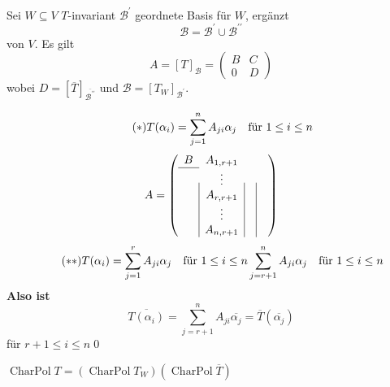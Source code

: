 \begin{subtheorem}
	Sei $ W \subseteq V $ $ T $-invariant $ \mathcal{B} ^\prime  $ geordnete Basis für $ W $, ergänzt
	\[
		\mathcal{B} = \mathcal{B} ^\prime \cup \mathcal{B} ^{\prime\prime} 
	\]
	von $ V $.
	Es gilt
	\[
		A = [T]_\mathcal{B} = \begin{pmatrix} B & C \\ 0 & D \end{pmatrix} 
	\]
	wobei $ D = \left[ \overline{T}  \right]_{\overline{\mathcal{B} ^{\prime\prime} } }  $ 
	und $ \mathcal{B} = \left[ T_W \right]_{\mathcal{B} ^\prime }  $.
\end{subtheorem}
\begin{subproof}
	\begin{equation}
		\label{3.22.2.1}
		\tag{$ * $}
		T(\alpha_i) = \sum_{j=1}^{n} A_{ji} \alpha_j \quad \text{für $ 1 \leq i \leq n $} 
	\end{equation}
	\[
		A =
		\left( 
			\begin{array}{c|c|c|c}
				B & A_{1, r + 1} & & \\\cline{1-1}
				  & \vdots & & \\
				  & A_{r, r + 1} & & \\
				  & \vdots & & \\
				  & A_{n, r + 1} & &
			\end{array}
		\right) 
	\]
	\begin{equation}
		\label{3.22.2.2}
		\tag{$ ** $}
		T(\alpha_i) = \sum_{j=1}^{r} A_{ji} \alpha_j \quad \text{für $ 1 \leq i \leq n $} \sum_{j=r + 1}^{n} A_{ji} \alpha_j \quad \text{für $ 1 \leq i \leq n $} 
	\end{equation}
	\textbf{Also ist}
	\[
		\overline{T(\alpha_i)} = \sum_{j=r + 1}^{n} A_{ji} \overline{\alpha_j} = \overline{T} \left( \overline{\alpha_j}  \right) 
	\]
	für $ r + 1 \leq  i \leq n $\qed
\end{subproof}

\begin{subcorollary}
	$ \operatorname{Char Pol} T = \left( \operatorname{Char Pol} T_W \right) \left( \operatorname{Char Pol} \overline{T}  \right)  $
\end{subcorollary}


